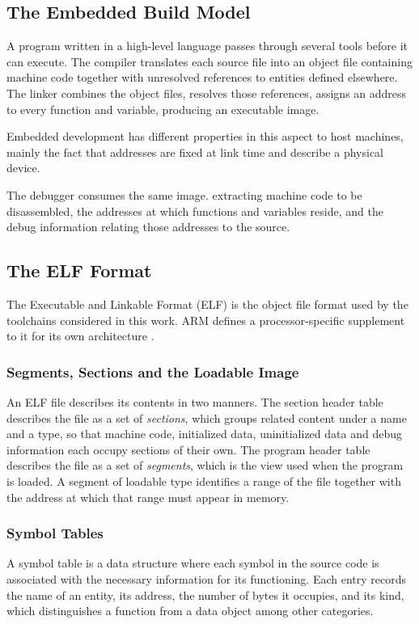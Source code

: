 \subsection{The Embedded Build Model}
A program written in a high-level language passes through several tools before it can execute. The compiler translates each source file into an object file containing machine code together with unresolved references to entities defined elsewhere. The linker combines the object files, resolves those references, assigns an address to every function and variable, producing an executable image.

Embedded development has different properties in this aspect to host machines, mainly the fact that addresses are fixed at link time and describe a physical device.

The debugger consumes the same image. extracting machine code to be disassembled, the addresses at which functions and variables reside, and the debug information relating those addresses to the source.

\subsection{The ELF Format}
The Executable and Linkable Format (ELF) is the object file format used by the toolchains considered in this work. ARM defines a processor-specific supplement to it for its own architecture \cite{aaelf32}.

\subsubsection{Segments, Sections and the Loadable Image}
An ELF file describes its contents in two manners. The section header table describes the file as a set of \textit{sections}, which groups related content under a name and a type, so that machine code, initialized data, uninitialized data and debug information each occupy sections of their own. The program header table describes the file as a set of \textit{segments}, which is the view used when the program is loaded. A segment of loadable type identifies a range of the file together with the address at which that range must appear in memory.

\subsubsection{Symbol Tables}
A symbol table is a data structure where each symbol in the source code is associated with the necessary information for its functioning. Each entry records the name of an entity, its address, the number of bytes it occupies, and its kind, which distinguishes a function from a data object among other categories.

